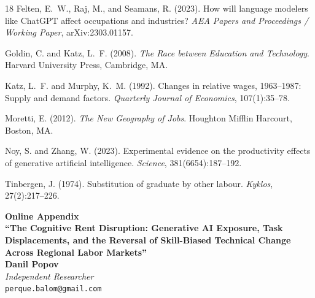 \documentclass[12pt]{article}
\begin{document}
\begin{thebibliography}{18}
Felten, E.~W., Raj, M., and Seamans, R. (2023).
\newblock How will language modelers like ChatGPT affect occupations and industries?
\newblock \emph{AEA Papers and Proceedings / Working Paper}, arXiv:2303.01157.

Goldin, C. and Katz, L.~F. (2008).
\newblock \emph{The Race between Education and Technology}.
\newblock Harvard University Press, Cambridge, MA.

Katz, L.~F. and Murphy, K.~M. (1992).
\newblock Changes in relative wages, 1963--1987: Supply and demand factors.
\newblock \emph{Quarterly Journal of Economics}, 107(1):35--78.

Moretti, E. (2012).
\newblock \emph{The New Geography of Jobs}.
\newblock Houghton Mifflin Harcourt, Boston, MA.

Noy, S. and Zhang, W. (2023).
\newblock Experimental evidence on the productivity effects of generative artificial intelligence.
\newblock \emph{Science}, 381(6654):187--192.

Tinbergen, J. (1974).
\newblock Substitution of graduate by other labour.
\newblock \emph{Kyklos}, 27(2):217--226.

\end{thebibliography}


\clearpage
\appendix
\setcounter{page}{1}
\renewcommand{\thepage}{A-\arabic{page}}
\renewcommand{\thesection}{A\arabic{section}}
\renewcommand{\thetable}{A\arabic{table}}
\renewcommand{\thefigure}{A\arabic{figure}}
\renewcommand{\theequation}{A\arabic{equation}}

\begin{center}
\LARGE \textbf{Online Appendix} \\
\vspace{0.4em}
\Large \textbf{``The Cognitive Rent Disruption: Generative AI Exposure, Task Displacements, and the Reversal of Skill-Biased Technical Change Across Regional Labor Markets''} \\
\vspace{1.0em}
\normalsize \textbf{Danil Popov} \\
\textit{Independent Researcher} \\
\texttt{perque.balom@gmail.com}
\end{center}

\vspace{1.5em}
\end{document}
